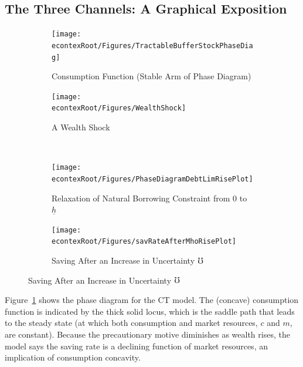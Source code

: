 \documentclass[titlepage]{\econtex}
\begin{document}
\subsection{The Three Channels: A Graphical Exposition} \label{ss3channels}


\hypertarget{PhaseDiag}{}

\begin{figure}	\caption{Consumption/Saving Dynamics in a Simple Buffer Stock Model}
	\centering
	\begin{subfigure}[t]{0.49\textheight}
		\centering
		{ \texttt{[image: \\econtexRoot/Figures/TractableBufferStockPhaseDiag]}}
		\caption{Consumption Function (Stable Arm of Phase Diagram)}		\label{fig:PhaseDiag}
	\end{subfigure}
	\begin{subfigure}[t]{0.49\textheight}
		\centering
		{ \texttt{[image: \\econtexRoot/Figures/WealthShock]}}
		\caption{A Wealth Shock}\label{fig:WealthShock}
	\end{subfigure} \\
	\begin{subfigure}[t]{0.49\textheight}
		\centering
		{ \texttt{[image: \\econtexRoot/Figures/PhaseDiagramDebtLimRisePlot]}}
		\caption{Relaxation of Natural Borrowing Constraint from 0 to $\underline{h}$}	\label{fig:PhaseDiagramDebtLimRise}	
	\end{subfigure}
	\begin{subfigure}[t]{0.49\textheight}
		\centering
		{ \texttt{[image: \\econtexRoot/Figures/savRateAfterMhoRisePlot]}}
		\caption{Saving After an Increase in Uncertainty $\mho$} \label{fig:savRateAfterMhoRisePlot}
\end{subfigure}
\end{figure}


Figure~\ref{fig:PhaseDiag} shows the phase diagram for the CT model.  The (concave) consumption function is indicated by the thick solid locus, which is the saddle path that leads to the steady state (at which  both consumption and market resources, $c$ and $m$, are constant).  Because the precautionary motive diminishes as wealth rises, the model says the saving rate is a declining function of market resources, an implication of consumption concavity. %
\end{document}
